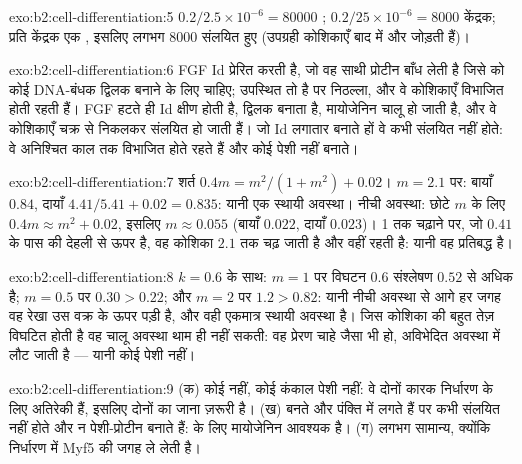 \begin{solution}{exo:b2:cell-differentiation:5}
$0.2/2.5\times 10^{-6} = \num{80000}$ ; $0.2/25\times 10^{-6}
= \num{8000}$ केंद्रक; प्रति केंद्रक एक , इसलिए लगभग \num{8000}
 संलयित हुए (उपग्रही कोशिकाएँ बाद में और जोड़ती हैं)।
\end{solution}

\begin{solution}{exo:b2:cell-differentiation:6}
FGF Id प्रेरित करती है, जो वह साथी प्रोटीन बाँध लेती है जिसे  को कोई
DNA-बंधक द्विलक बनाने के लिए चाहिए;  उपस्थित तो है पर निठल्ला, और वे
कोशिकाएँ विभाजित होती रहती हैं। FGF हटते ही Id क्षीण होती है, 
द्विलक बनाता है, मायोजेनिन चालू हो जाती है, और वे कोशिकाएँ चक्र से निकलकर
संलयित हो जाती हैं। जो  Id लगातार बनाते हों वे कभी संलयित नहीं
होते: वे अनिश्चित काल तक विभाजित होते रहते हैं और कोई पेशी नहीं बनाते।
\end{solution}

\begin{solution}{exo:b2:cell-differentiation:7}
शर्त $0.4m = m^{2}/(1 + m^{2}) + 0.02$। $m = 2.1$ पर: बायाँ
$0.84$, दायाँ $4.41/5.41 + 0.02 = 0.835$: यानी एक स्थायी अवस्था। नीची
अवस्था: छोटे $m$ के लिए $0.4m \approx m^{2} + 0.02$, इसलिए $m \approx
0.055$ (बायाँ $0.022$, दायाँ $0.023$)। 1 तक चढ़ाने पर, जो
$0.41$ के पास की देहली से ऊपर है, वह कोशिका $2.1$ तक चढ़ जाती है और वहीं
रहती है: यानी वह प्रतिबद्ध है।
\end{solution}

\begin{solution}{exo:b2:cell-differentiation:8}
$k = 0.6$ के साथ: $m = 1$ पर विघटन $0.6$ संश्लेषण
$0.52$ से अधिक है; $m = 0.5$ पर $0.30 > 0.22$; और $m = 2$ पर $1.2 > 0.82$: यानी
नीची अवस्था से आगे हर जगह वह रेखा उस वक्र के ऊपर पड़ी है, और वही
एकमात्र स्थायी अवस्था है। जिस कोशिका की  बहुत तेज़ विघटित होती है
वह चालू अवस्था थाम ही नहीं सकती: वह प्रेरण चाहे जैसा भी हो, अविभेदित
अवस्था में लौट जाती है --- यानी कोई पेशी नहीं।
\end{solution}

\begin{solution}{exo:b2:cell-differentiation:9}
(क) कोई  नहीं, कोई कंकाल पेशी नहीं: वे दोनों कारक
निर्धारण के लिए अतिरेकी हैं, इसलिए दोनों का जाना ज़रूरी है। (ख) 
बनते और पंक्ति में लगते हैं पर कभी संलयित नहीं होते और न पेशी-प्रोटीन
बनाते हैं:  के लिए मायोजेनिन आवश्यक है। (ग) लगभग सामान्य, क्योंकि
निर्धारण में Myf5  की जगह ले लेती है।
\end{solution}

